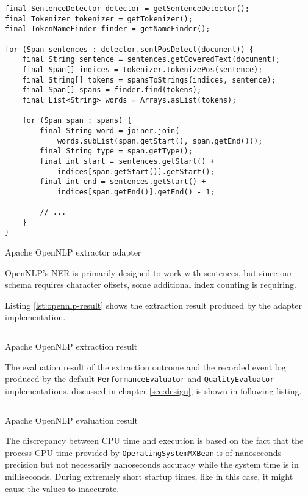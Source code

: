\begin{listing}[H]
\begin{verbatim}
final SentenceDetector detector = getSentenceDetector();
final Tokenizer tokenizer = getTokenizer();
final TokenNameFinder finder = getNameFinder();

for (Span sentences : detector.sentPosDetect(document)) {
    final String sentence = sentences.getCoveredText(document);
    final Span[] indices = tokenizer.tokenizePos(sentence);
    final String[] tokens = spansToStrings(indices, sentence);
    final Span[] spans = finder.find(tokens);
    final List<String> words = Arrays.asList(tokens);

    for (Span span : spans) {
        final String word = joiner.join(
            words.subList(span.getStart(), span.getEnd()));
        final String type = span.getType();
        final int start = sentences.getStart() + 
            indices[span.getStart()].getStart();
        final int end = sentences.getStart() + 
            indices[span.getEnd()].getEnd() - 1;

        // ...
    }
}
\end{verbatim}
\caption{Apache OpenNLP extractor adapter}
\label{lst:opennlp-adapter}
\end{listing}

OpenNLP's \gls{NER} is primarily designed to work with sentences, but since our schema requires character offsets, some additional index counting is requiring.

\newpage
Listing \ref{lst:opennlp-result} shows the extraction result produced by the adapter implementation.

\begin{listing}[H]
\inputminted{xml}{opennlp.xml}
\caption{Apache OpenNLP extraction result}
\label{lst:opennlp-result}
\end{listing}

The evaluation result of the extraction outcome and the recorded event log produced by the default \texttt{PerformanceEvaluator} and \texttt{QualityEvaluator} implementations, discussed in chapter \ref{sec:design}, is shown in following listing.


\begin{listing}[H]
\inputminted{java}{opennlp.txt}
\caption{Apache OpenNLP evaluation result}
\label{lst:opennlp-eval-result}
\end{listing}

The discrepancy between CPU time and execution is based on the fact that the process CPU time provided by \texttt{OperatingSystemMXBean} is of nanoseconds precision but not necessarily nanoseconds accuracy\cite{OperatingSystemMXBean} while the system time is in milliseconds. During extremely short startup times, like in this case, it might cause the values to inaccurate.

